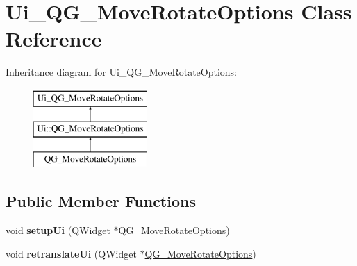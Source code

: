 \hypertarget{classUi__QG__MoveRotateOptions}{\section{Ui\-\_\-\-Q\-G\-\_\-\-Move\-Rotate\-Options Class Reference}
\label{classUi__QG__MoveRotateOptions}
}
Inheritance diagram for Ui\-\_\-\-Q\-G\-\_\-\-Move\-Rotate\-Options\-:\begin{figure}[H]
\begin{center}
\leavevmode
\includegraphics[height=3.000000cm]{classUi__QG__MoveRotateOptions}
\end{center}
\end{figure}
\subsection*{Public Member Functions}
\begin{DoxyCompactItemize}
\item 
\hypertarget{classUi__QG__MoveRotateOptions_afc3ba5517f2e0d7ba0a382fda61e2ba4}{void {\bfseries setup\-Ui} (Q\-Widget $\ast$\hyperlink{classQG__MoveRotateOptions}{Q\-G\-\_\-\-Move\-Rotate\-Options})}\label{classUi__QG__MoveRotateOptions_afc3ba5517f2e0d7ba0a382fda61e2ba4}

\item 
\hypertarget{classUi__QG__MoveRotateOptions_a5dbb03d7bb9c1c421bf47d9d6cd779c1}{void {\bfseries retranslate\-Ui} (Q\-Widget $\ast$\hyperlink{classQG__MoveRotateOptions}{Q\-G\-\_\-\-Move\-Rotate\-Options})}\label{classUi__QG__MoveRotateOptions_a5dbb03d7bb9c1c421bf47d9d6cd779c1}

\end{DoxyCompactItemize}
